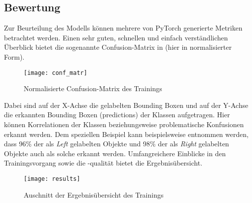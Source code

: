 \subsection{Bewertung}
Zur Beurteilung des Modells können mehrere von PyTorch generierte Metriken betrachtet werden. Einen sehr guten, schnellen und einfach verständlichen Überblick bietet die sogenannte
Confusion-Matrix in  (hier in normalisierter Form).

\begin{figure}[H]
    \centering
    \texttt{[image: conf\_matr]}
    \caption{Normalisierte Confusion-Matrix des Trainings}\label{conf_matr}
\end{figure}

Dabei sind auf der X-Achse die gelabelten Bounding Boxen und auf der Y-Achse die erkannten Bounding Boxen (predictions) der Klassen aufgetragen.
Hier können Korrelationen der Klassen beziehungsweise problematische Konfusionen erkannt werden.
\cite{yolo_metrics}
\newPar
Dem speziellen Beispiel kann beispielsweise entnommen werden, dass 96\% der als \textit{Left} gelabelten Objekte und 98\% der als \textit{Right}
gelabelten Objekte auch als solche erkannt werden.
\newPar
Umfangreichere Einblicke in den Trainingsvorgang sowie die \hyp{}qualität bietet die Ergebnisübersicht.

\begin{figure}[H]
    \centering
    \texttt{[image: results]}
    \caption{Auschnitt der Ergebnisübersicht des Trainings}\label{results}
\end{figure}

